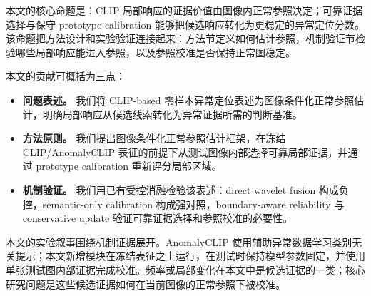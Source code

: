本文的核心命题是：CLIP 局部响应的证据价值由图像内正常参照决定；可靠证据选择与保守 prototype calibration 能够把候选响应转化为更稳定的异常定位分数。该命题把方法设计和实验验证连接起来：方法节定义如何估计参照，机制验证节检验哪些局部响应能进入参照，以及参照校准是否保持正常图稳定。

本文的贡献可概括为三点：
\begin{itemize}
  \item \textbf{问题表述。} 我们将 CLIP-based 零样本异常定位表述为图像条件化正常参照估计，明确局部响应从候选线索转化为异常证据所需的判断基准。
  \item \textbf{方法原则。} 我们提出图像条件化正常参照估计框架，在冻结 CLIP/AnomalyCLIP 表征的前提下从测试图像内部选择可靠局部证据，并通过 prototype calibration 重新评分局部区域。
  \item \textbf{机制验证。} 我们用已有受控消融检验该表述：direct wavelet fusion 构成负控，semantic-only calibration 构成强对照，boundary-aware reliability 与 conservative update 验证可靠证据选择和参照校准的必要性。
\end{itemize}

本文的实验叙事围绕机制证据展开。AnomalyCLIP 使用辅助异常数据学习类别无关提示；本文新增模块在冻结表征之上运行，在测试时保持模型参数固定，并使用单张测试图内部证据完成校准。频率或局部变化在本文中是候选证据的一类；核心研究问题是这些候选证据如何在当前图像的正常参照下被校准。
